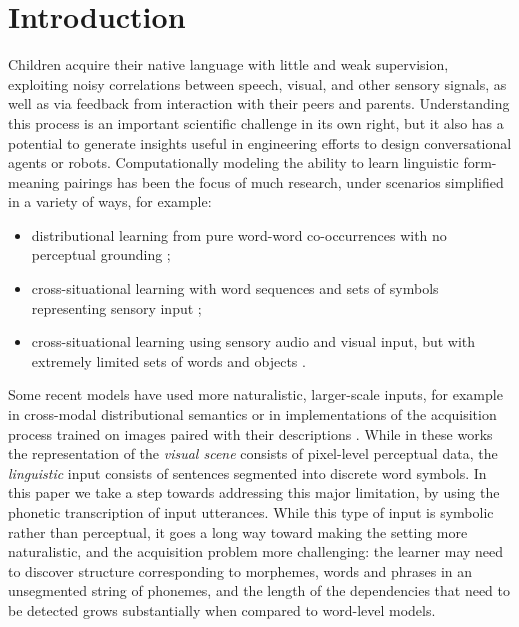 \section{Introduction}
\label{sec:intro}

Children acquire their native language with little and weak
supervision, exploiting noisy correlations between speech, visual, and
other sensory signals, as well as via feedback from interaction with
their peers and parents. Understanding this process is an important
scientific challenge in its own right, but it also has a potential to
generate insights useful in engineering efforts to design
conversational agents or robots. Computationally modeling the ability
to learn linguistic form-meaning pairings has been the focus of much
research, under scenarios simplified in a variety of ways, for
example:
\begin{itemize}
\item distributional learning from pure word-word co-occurrences with
  no perceptual grounding \cite{landauer1998introduction,kiros2015skip};
\item cross-situational learning with word sequences and sets of
  symbols representing sensory input
  \cite{siskind.96,fazly.etal.10csj};
\item cross-situational learning using sensory audio and visual
  input, but with extremely limited sets of words and objects
  \cite{Roy2002113,iwahashi2003language}.
\end{itemize}

Some recent models have used more naturalistic, larger-scale inputs,
for example in cross-modal distributional semantics
\cite{lazaridou2015combining} or in implementations of the acquisition
process trained on images paired with their descriptions
\cite{chrupala2015learning}. While in these works the representation
of the {\it visual scene} consists of pixel-level perceptual data, the
{\it linguistic} input consists of sentences segmented into discrete
word symbols. In this paper we take a step towards addressing this
major limitation, by using the phonetic transcription of input
utterances. While this type of input is symbolic rather than
perceptual, it goes a long way toward making the setting more
naturalistic, and the acquisition problem more challenging: the
learner may need to discover structure corresponding to morphemes, words
and phrases in an unsegmented string of phonemes, and the length of
the dependencies that need to be detected grows substantially when
compared to word-level models.


